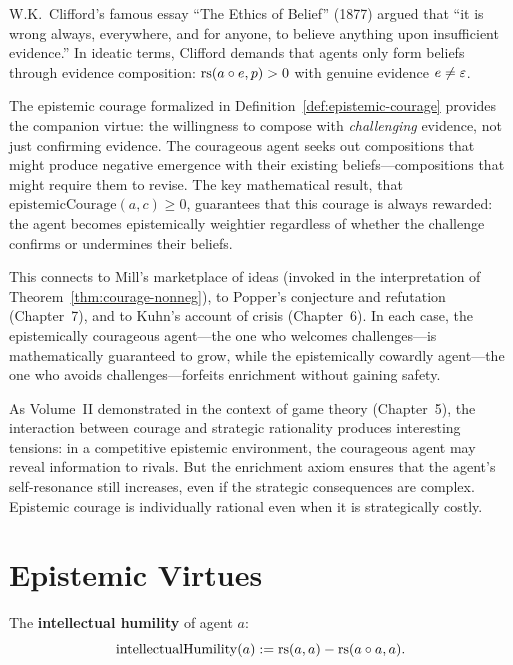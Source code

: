 \begin{remark}
W.K.\ Clifford's famous essay ``The Ethics of Belief'' (1877) argued that ``it is
wrong always, everywhere, and for anyone, to believe anything upon insufficient
evidence.'' In ideatic terms, Clifford demands that agents only form beliefs
through evidence composition: $\mathrm{rs}(a \circ e, p) > 0$ with genuine evidence
$e \neq \varepsilon$.

The epistemic courage formalized in Definition~\ref{def:epistemic-courage} provides
the companion virtue: the willingness to compose with \emph{challenging} evidence,
not just confirming evidence. The courageous agent seeks out compositions that
might produce negative emergence with their existing beliefs---compositions that
might require them to revise. The key mathematical result, that
$\mathrm{epistemicCourage}(a, c) \geq 0$, guarantees that this courage is
always rewarded: the agent becomes epistemically weightier regardless of whether
the challenge confirms or undermines their beliefs.

This connects to Mill's marketplace of ideas (invoked in the interpretation
of Theorem~\ref{thm:courage-nonneg}), to Popper's conjecture and refutation
(Chapter~7), and to Kuhn's account of crisis (Chapter~6). In each case, the
epistemically courageous agent---the one who welcomes challenges---is
mathematically guaranteed to grow, while the epistemically cowardly agent---the
one who avoids challenges---forfeits enrichment without gaining safety.

As Volume~II demonstrated in the context of game theory (Chapter~5), the
interaction between courage and strategic rationality produces interesting tensions:
in a competitive epistemic environment, the courageous agent may reveal
information to rivals. But the enrichment axiom ensures that the agent's
self-resonance still increases, even if the strategic consequences are
complex. Epistemic courage is individually rational even when it is
strategically costly.
\end{remark}


\section{Epistemic Virtues}

\begin{definition}
\label{def:humility}
The \textbf{intellectual humility} of agent $a$:
\[
  \mathrm{intellectualHumility}(a) := \mathrm{rs}(a, a) - \mathrm{rs}(a \circ a, a).
\]
\end{definition}

